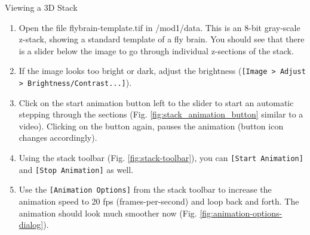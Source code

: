 \begin{taskbox}{Viewing a 3D Stack}

\begin{enumerate}
	\item Open the file flybrain-template.tif in /mod1/data. This is an 8-bit gray-scale z-stack, showing a standard template of a fly brain. You should see that there is a slider below the image to go through individual z-sections of the stack. 
	\item If the image looks too bright or dark, adjust the brightness (\texttt{[Image > Adjust > Brightness/Contrast...]}).
	\item Click on the start animation button left to the slider to start an automatic stepping through the sections (Fig. \ref{fig:stack_animation_button} similar to a video). Clicking on the button again, pauses the animation (button icon changes accordingly).
	
	\begin{minipage}[t]{\linewidth}
		\begin{center}
		\medskip
		\label{fig:stack-animation-button}
		\end{center}
	\end{minipage}
	
	\item Using the stack toolbar (Fig. \ref{fig:stack-toolbar}), you can \texttt{[Start Animation]} and \texttt{[Stop Animation]} as well.
	
	\begin{minipage}[t]{\linewidth}
		\begin{center}
		\medskip
		\label{fig:stack-toolbar}
		\end{center}
	\end{minipage}
	
	\item Use the \texttt{[Animation Options]} from the stack toolbar to increase the animation speed to 20 fps (frames-per-second) and loop back and forth. The animation should look much smoother now (Fig. \ref{fig:animation-options-dialog}).
	

\end{enumerate}
\end{taskbox}
